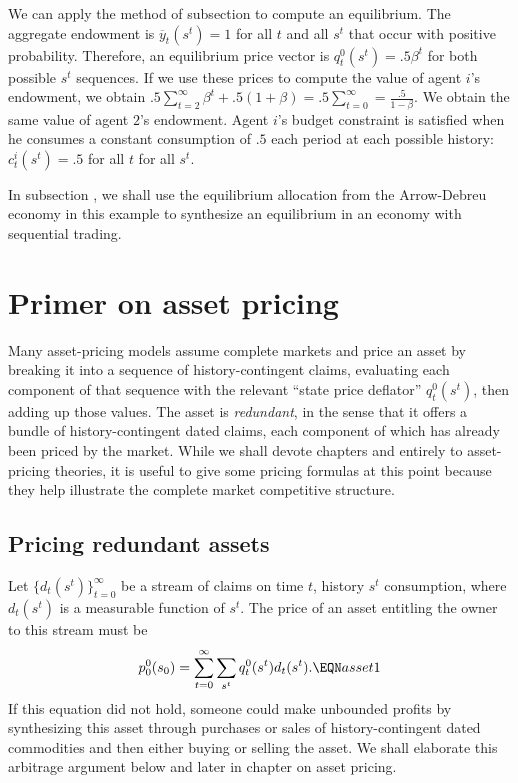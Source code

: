 We can apply the method of subsection  to compute an equilibrium.  The aggregate endowment is $\overline y_t(s^t)=1$
for all $t$ and all $s^t$ that occur with positive probability.  Therefore, an equilibrium price vector is $q_t^0 (s^t) = .5 \beta^t$ for
both possible $s^t$ sequences.
If we use these prices to compute the value of agent $i$'s endowment, we obtain $.5 \sum_{t=2}^\infty \beta^t + .5 (1 + \beta) = .5 \sum_{t=0}^\infty
 = {\frac{.5}{1-\beta}}$.  We obtain the same value of agent $2$'s endowment.
%
  Agent $i$'s budget constraint is satisfied when he consumes a constant
consumption of $.5$ each period at  each possible history: $c_t^i(s^t) = .5$ for all $t$ for all $s^t$.

In subsection , we shall use the equilibrium allocation from the Arrow-Debreu economy in this example
to synthesize an equilibrium in an economy with sequential trading.





\section{Primer on asset pricing}
Many asset-pricing models       assume complete markets and price
an asset by breaking it into a sequence of history-contingent
claims, evaluating each  component of that sequence with the
relevant ``state price deflator'' $q_t^0(s^t)$, then adding up
those values. The  asset is  {\it redundant\/}, in the
sense that it offers a bundle of history-contingent dated claims,
each component of which has already  been priced by the market.
While we shall devote chapters  and  entirely  to
asset-pricing theories, it is useful to give some pricing formulas
at this  point because they help illustrate  the complete market
competitive structure.


\subsection{Pricing redundant assets}
  Let $\{d_t(s^t)\}_{t=0}^\infty$ be a stream of claims
on time $t$, history $s^t$ consumption, where $d_t(s^t)$ is a measurable
function of $s^t$.  The price of   an asset entitling
the owner to this stream
must be
$$ p^0_0(s_0)  = \sum_{t=0}^\infty  \sum_{s^t} q_t^0(s^t) d_t(s^t) . \EQN asset1
$$
If this equation did not hold, someone could make unbounded profits
by synthesizing this asset  through
purchases or sales  of  history-contingent dated commodities
and then either buying or selling the asset.
We shall elaborate  this arbitrage argument
below and later in  chapter  on asset pricing.




